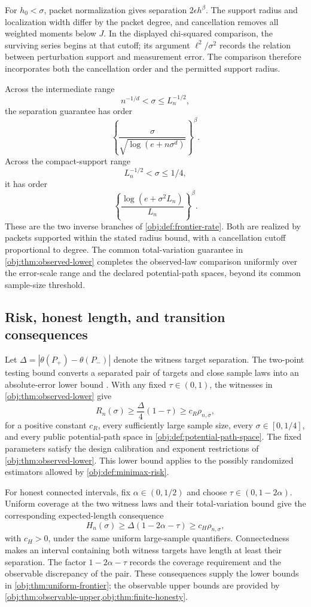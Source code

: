 For \(h_0<\sigma\), packet normalization gives separation \(2\epsilon h^\beta\). The support radius and localization width differ by the packet degree, and cancellation removes all weighted moments below \(J\). In the displayed chi-squared comparison, the surviving series begins at that cutoff; its argument \(\ell^2/\sigma^2\) records the relation between perturbation support and measurement error. The comparison therefore incorporates both the cancellation order and the permitted support radius.

Across the intermediate range
\[
n^{-1/d}<\sigma\le L_n^{-1/2},
\]
the separation guarantee has order
\[
\left\{\frac{\sigma}{\sqrt{\log(e+n\sigma^d)}}\right\}^{\beta}.
\]
Across the compact-support range
\[
L_n^{-1/2}<\sigma\le1/4,
\]
it has order
\[
\left\{\frac{\log(e+\sigma^2L_n)}{L_n}\right\}^{\beta}.
\]
These are the two inverse branches of \cref{obj:def:frontier-rate}. Both are realized by packets supported within the stated radius bound, with a cancellation cutoff proportional to degree. The common total-variation guarantee in \cref{obj:thm:observed-lower} completes the observed-law comparison uniformly over the error-scale range and the declared potential-path spaces, beyond its common sample-size threshold.

\subsection{Risk, honest length, and transition consequences}

Let \(\Delta=|\theta(P_+)-\theta(P_-)|\) denote the witness target separation. The two-point testing bound converts a separated pair of targets and close sample laws into an absolute-error lower bound \citep[Section 2.2, Theorem 2.2]{Tsybakov2009}. With any fixed \(\tau\in(0,1)\), the witnesses in \cref{obj:thm:observed-lower} give
\[
R_n(\sigma)\ge \frac{\Delta}{4}(1-\tau)
\ge c_R\rho_{n,\sigma},
\]
for a positive constant \(c_R\), every sufficiently large sample size, every \(\sigma\in[0,1/4]\), and every public potential-path space in \cref{obj:def:potential-path-space}. The fixed parameters satisfy the design calibration and exponent restrictions of \cref{obj:thm:observed-lower}. This lower bound applies to the possibly randomized estimators allowed by \cref{obj:def:minimax-risk}.

For honest connected intervals, fix \(\alpha\in(0,1/2)\) and choose \(\tau\in(0,1-2\alpha)\). Uniform coverage at the two witness laws and their total-variation bound give the corresponding expected-length consequence
\[
H_n(\sigma)\ge \Delta(1-2\alpha-\tau)
\ge c_H\rho_{n,\sigma},
\]
with \(c_H>0\), under the same uniform large-sample quantifiers. Connectedness makes an interval containing both witness targets have length at least their separation. The factor \(1-2\alpha-\tau\) records the coverage requirement and the observable discrepancy of the pair. These consequences supply the lower bounds in \cref{obj:thm:uniform-frontier}; the observable upper bounds are provided by \cref{obj:thm:observable-upper,obj:thm:finite-honesty}.

